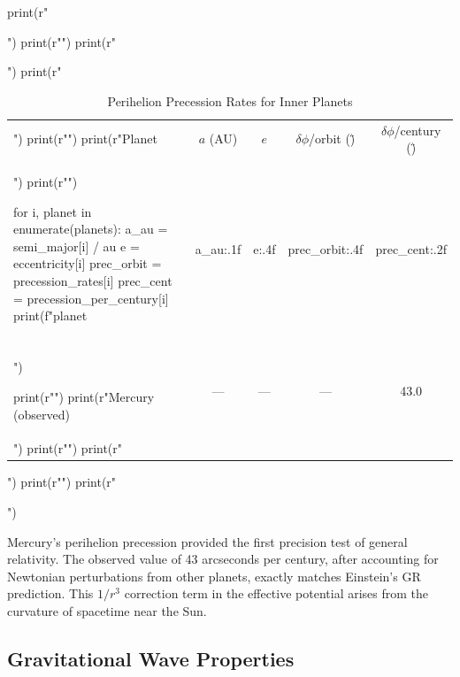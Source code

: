 \documentclass[a4paper, 11pt]{article}
\begin{document}
\begin{pycode}
print(r"\begin{table}[htbp]")
print(r"\centering")
print(r"\caption{Perihelion Precession Rates for Inner Planets}")
print(r"\begin{tabular}{lcccc}")
print(r"\toprule")
print(r"Planet & $a$ (AU) & $e$ & $\delta\phi$/orbit (\") & $\delta\phi$/century (\") \\")
print(r"\midrule")

for i, planet in enumerate(planets):
    a_au = semi_major[i] / au
    e = eccentricity[i]
    prec_orbit = precession_rates[i]
    prec_cent = precession_per_century[i]
    print(f"{planet} & {a_au:.1f} & {e:.4f} & {prec_orbit:.4f} & {prec_cent:.2f} \\\\")

print(r"\midrule")
print(r"Mercury (observed) & --- & --- & --- & 43.0 \\")
print(r"\bottomrule")
print(r"\end{tabular}")
print(r"\label{tab:precession}")
print(r"\end{table}")
\end{pycode}

Mercury's perihelion precession provided the first precision test of general relativity. The
observed value of 43 arcseconds per century, after accounting for Newtonian perturbations
from other planets, exactly matches Einstein's GR prediction. This $1/r^3$ correction term
in the effective potential arises from the curvature of spacetime near the Sun.

\subsection{Gravitational Wave Properties}
\end{document}
